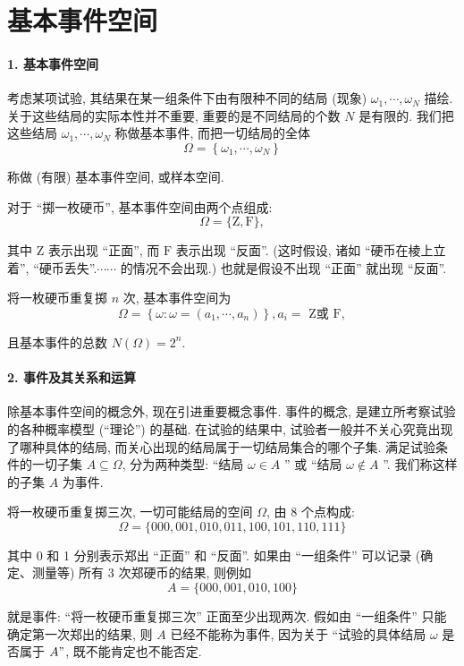 \section{基本事件空间}
\paragraph{1. 基本事件空间}  考虑某项试验, 其结果在某一组条件下由有限种不同的结局 (现象) $\omega_1, \cdots, \omega_N$ 描绘. 关于这些结局的实际本性并不重要, 重要的是不同结局的个数 $N$ 是有限的. 我们把这些结局 $\omega_1, \cdots, \omega_N$ 称做基本事件, 而把一切结局的全体
$$
\Omega=\left\{\omega_1, \cdots, \omega_N\right\}
$$

称做 (有限) 基本事件空间, 或样本空间.

\begin{example}
    对于 “掷一枚硬币”, 基本事件空间由两个点组成:
$$
\Omega=\{\mathrm{Z}, \mathrm{F}\},
$$

其中 Z 表示出现 “正面”, 而 $\mathrm{F}$ 表示出现 “反面”. (这时假设, 诸如 “硬币在棱上立着”, “硬币丢失”.$\cdots \cdots$ 的情况不会出现.) 也就是假设不出现 “正面” 就出现 “反面”.

    将一枚硬币重复掷 $n$ 次, 基本事件空间为
$$
\Omega=\left\{\omega: \omega=\left(a_1, \cdots, a_n\right)\right\}, a_i=\text { Z或 } \mathrm{F},
$$

且基本事件的总数 $N(\Omega)=2^n$.
\end{example}

\paragraph{2. 事件及其关系和运算} 除基本事件空间的概念外, 现在引进重要概念事件. 事件的概念, 是建立所考察试验的各种概率模型 (“理论”) 的基础. 在试验的结果中, 试验者一般并不关心究竟出现了哪种具体的结局, 而关心出现的结局属于一切结局集合的哪个子集. 满足试验条件的一切子集 $A \subseteq \Omega$, 分为两种类型: “结局 $\omega \in A$ ” 或 “结局 $\omega \notin A$ ”. 我们称这样的子集 $A$ 为事件.

\begin{example}
    将一枚硬币重复掷三次, 一切可能结局的空间 $\Omega$, 由 8 个点构成:
$$
\Omega=\{000,001,010,011,100,101,110,111\}
$$

其中 0 和 1 分别表示郑出 “正面” 和 “反面”. 如果由 “一组条件” 可以记录 (确定、测量等) 所有 3 次郑硬币的结果, 则例如
$$
A=\{000,001,010,100\}
$$

就是事件: “将一枚硬币重复掷三次” 正面至少出现两次. 假如由 “一组条件” 只能确定第一次郑出的结果, 则 $A$ 已经不能称为事件, 因为关于 “试验的具体结局 $\omega$ 是否属于 $A "$, 既不能肯定也不能否定.
\end{example}

